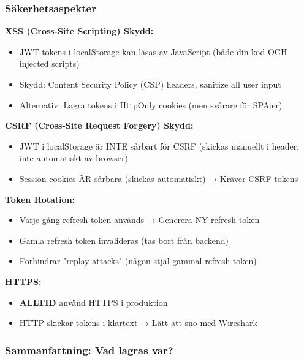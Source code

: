 \documentclass[12pt,a4paper]{article}
\begin{document}
\subsubsection{Säkerhetsaspekter}

\textbf{XSS (Cross-Site Scripting) Skydd:}
\begin{itemize}[noitemsep]
  \item JWT tokens i localStorage kan läsas av JavaScript (både din kod OCH injected scripts)
  \item Skydd: Content Security Policy (CSP) headers, sanitize all user input
  \item Alternativ: Lagra tokens i HttpOnly cookies (men svårare för SPA:er)
\end{itemize}

\textbf{CSRF (Cross-Site Request Forgery) Skydd:}
\begin{itemize}[noitemsep]
  \item JWT i localStorage är INTE sårbart för CSRF (skickas manuellt i header, inte automatiskt av browser)
  \item Session cookies ÄR sårbara (skickas automatiskt) → Kräver CSRF-tokens
\end{itemize}

\textbf{Token Rotation:}
\begin{itemize}[noitemsep]
  \item Varje gång refresh token används → Generera NY refresh token
  \item Gamla refresh token invalideras (tas bort från backend)
  \item Förhindrar "replay attacks" (någon stjäl gammal refresh token)
\end{itemize}

\textbf{HTTPS:}
\begin{itemize}[noitemsep]
  \item \textbf{ALLTID} använd HTTPS i produktion
  \item HTTP skickar tokens i klartext → Lätt att sno med Wireshark
\end{itemize}

\subsubsection{Sammanfattning: Vad lagras var?}
\end{document}
